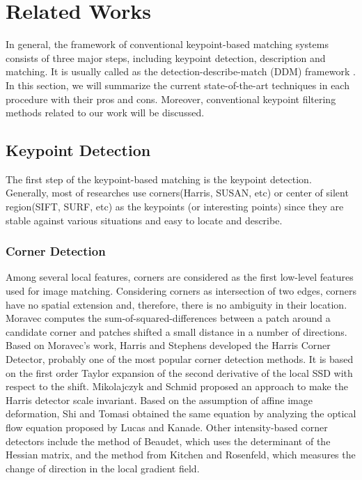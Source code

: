 
\section{Related Works}
In general, the framework of conventional keypoint-based matching systems consists of three major steps, including keypoint detection, description and matching. It is usually called as the detection-describe-match (DDM) framework \cite{yu_novel_2012}. In this section, we will summarize the current state-of-the-art techniques in each procedure with their pros and cons. Moreover, conventional keypoint filtering methods related to our work will be discussed.

\subsection{Keypoint Detection}
The first step of the keypoint-based matching is the keypoint detection. Generally, most of researches use corners(Harris\cite{harris_combined_1988}, SUSAN\cite{smith_susannew_1997}, etc) or center of silent region(SIFT\cite{lowe_distinctive_2004}, SURF\cite{bay_speeded-up_2008}, etc) as the keypoints (or interesting points) since they are stable against various situations and easy to locate and describe\cite{yu_novel_2012}.

\subsubsection{Corner Detection}
Among several local features, corners are considered as the first low-level features used for image matching. Considering corners as intersection of two edges, corners have no spatial extension and, therefore, there is no ambiguity in their location. Moravec\cite{moravec_obstacle_1980} computes the sum-of-squared-differences between a patch around a candidate corner and patches shifted a small distance in a number of directions. Based on Moravec's work, Harris and Stephens\cite{harris_combined_1988} developed the Harris Corner Detector, probably one of the most popular corner detection methods. It is based on the first order Taylor expansion of the second derivative of the local SSD with respect to the shift. Mikolajczyk and Schmid\cite{mikolajczyk_indexing_2001} proposed an approach to make the Harris detector scale invariant. 
Based on the assumption of affine image deformation, Shi and Tomasi\cite{shi_good_1994} obtained the same equation by analyzing the optical flow equation proposed by Lucas and Kanade\cite{lucas_iterative_1981}. Other intensity-based corner detectors include the method of Beaudet\cite{beaudet_rotationally_1978}, which uses the determinant of the Hessian matrix, and the method from Kitchen and Rosenfeld\cite{kitchen_gray-level_1982}, which measures the change of direction in the local gradient field. 

